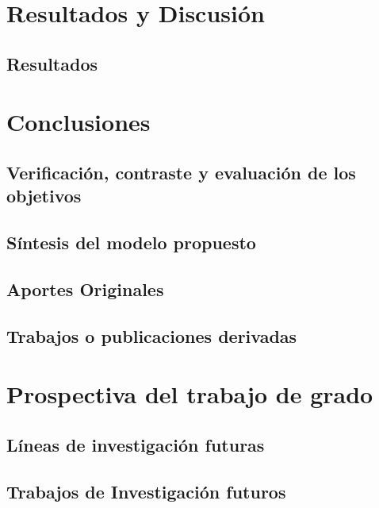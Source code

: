 \section{Resultados y Discusión}
\subsection{Resultados}
\section{Conclusiones}
\subsection{Verificación, contraste y evaluación de los objetivos}
\subsection{Síntesis del modelo propuesto}
\subsection{Aportes Originales}
\subsection{Trabajos o publicaciones derivadas}
\section{Prospectiva del trabajo de grado}
\subsection{Líneas de investigación futuras}
\subsection{Trabajos de Investigación futuros}
